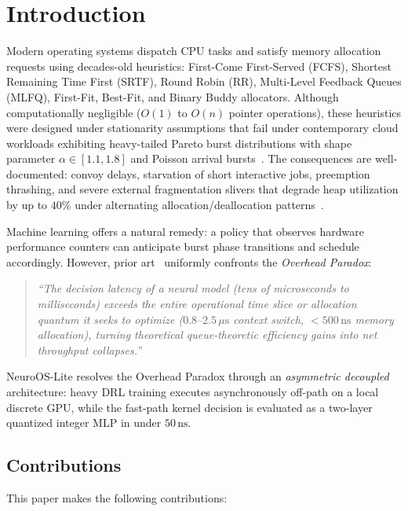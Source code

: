 \section{Introduction}
\label{sec:intro}

Modern operating systems dispatch CPU tasks and satisfy memory allocation
requests using decades-old heuristics: First-Come First-Served (FCFS),
Shortest Remaining Time First (SRTF), Round Robin (RR), Multi-Level Feedback
Queues (MLFQ), First-Fit, Best-Fit, and Binary Buddy allocators. Although
computationally negligible ($O(1)$ to $O(n)$ pointer operations), these
heuristics were designed under stationarity assumptions that fail under
contemporary cloud workloads exhibiting heavy-tailed Pareto burst distributions
with shape parameter $\alpha \in [1.1, 1.8]$ and Poisson arrival
bursts~\cite{Tsafrir2007,Arpaci2018}. The consequences are well-documented:
convoy delays, starvation of short interactive jobs, preemption thrashing, and
severe external fragmentation slivers that degrade heap utilization by up to
$40\%$ under alternating allocation/deallocation
patterns~\cite{Wilson1995,Johnstone1998}.

Machine learning offers a natural remedy: a policy that observes hardware
performance counters can anticipate burst phase transitions and schedule
accordingly. However, prior art~\cite{Mao2019,Stratos2020}
uniformly confronts the \emph{Overhead Paradox}:

\begin{quote}
\textit{``The decision latency of a neural model (tens of microseconds to
milliseconds) exceeds the entire operational time slice or allocation quantum
it seeks to optimize ($0.8\text{--}2.5\,\mu\text{s}$ context switch,
$<500\,\text{ns}$ memory allocation), turning theoretical queue-theoretic
efficiency gains into net throughput collapses.''}
\end{quote}

NeuroOS-Lite resolves the Overhead Paradox through an \textit{asymmetric
decoupled} architecture: heavy DRL training executes asynchronously off-path on
a local discrete GPU, while the fast-path kernel decision is evaluated as a
two-layer quantized integer MLP in under $50\,\text{ns}$.

\subsection*{Contributions}

This paper makes the following contributions:

